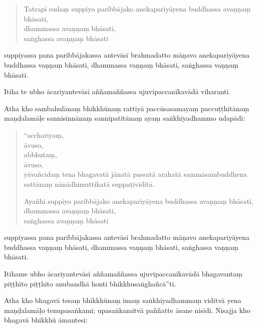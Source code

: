 \documentclass[11pt,twoside,openright]{book}
\begin{document}
\begin{verse}
Tatrapi sudaṃ suppiyo paribbājako anekapariyāyena buddhassa avaṇṇaṃ bhāsati,\\
\vin  dhammassa avaṇṇaṃ bhāsati,\\
\vin  saṅghassa avaṇṇaṃ bhāsati\\


\end{verse}
\pstart
suppiyassa pana paribbājakassa antevāsī brahmadatto māṇavo anekapariyāyena buddhassa vaṇṇaṃ bhāsati, dhammassa vaṇṇaṃ bhāsati, saṅghassa vaṇṇaṃ bhāsati.
\pend

\pstart
Itiha te ubho ācariyantevāsī aññamaññassa ujuvipaccanīkavādā viharanti.
\pend

\pstart
Atha kho sambahulānaṃ bhikkhūnaṃ rattiyā paccūsasamayaṃ paccuṭṭhitānaṃ maṇḍalamāḷe sannisinnānaṃ sannipatitānaṃ ayaṃ saṅkhiyadhammo udapādi:
\pend

\begin{verse}
“acchariyaṃ,\\
\vin  āvuso,\\
\vin  abbhutaṃ,\\
\vin  āvuso,\\
\vin  yāvañcidaṃ tena bhagavatā jānatā passatā arahatā sammāsambuddhena sattānaṃ nānādhimuttikatā suppaṭividitā.

Ayañhi suppiyo paribbājako anekapariyāyena buddhassa avaṇṇaṃ bhāsati,\\
\vin  dhammassa avaṇṇaṃ bhāsati,\\
\vin  saṅghassa avaṇṇaṃ bhāsati\\


\end{verse}
\pstart
suppiyassa pana paribbājakassa antevāsī brahmadatto māṇavo anekapariyāyena buddhassa vaṇṇaṃ bhāsati, dhammassa vaṇṇaṃ bhāsati, saṅghassa vaṇṇaṃ bhāsati.
\pend

\pstart
Itihame ubho ācariyantevāsī aññamaññassa ujuvipaccanīkavādā bhagavantaṃ piṭṭhito piṭṭhito anubandhā honti bhikkhusaṅghañcā”ti.
\pend

\pstart
Atha kho bhagavā tesaṃ bhikkhūnaṃ imaṃ saṅkhiyadhammaṃ viditvā yena maṇḍalamāḷo tenupasaṅkami; upasaṅkamitvā paññatte āsane nisīdi. Nisajja kho bhagavā bhikkhū āmantesi:
\pend
\end{document}
